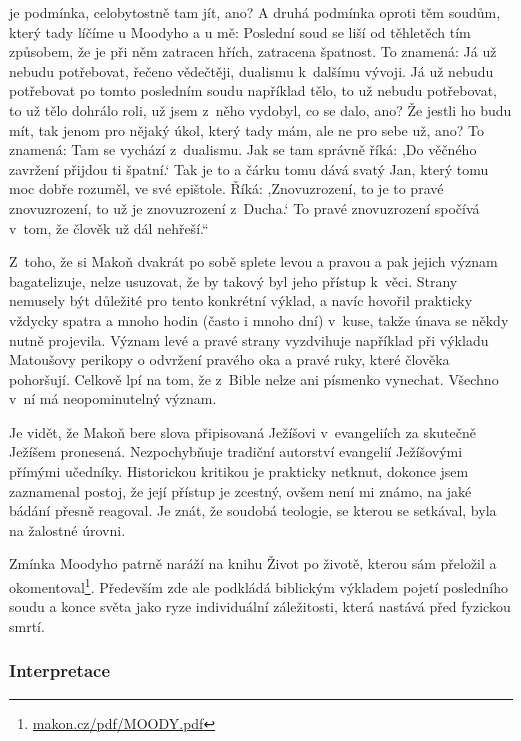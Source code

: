 \begin{enumerate}
{{je podmínka, celobytostně tam jít, ano? A druhá podmínka oproti těm soudům,
který tady líčíme u Moodyho a u mě: Poslední soud se liší od těhletěch tím
způsobem, že je při něm zatracen hřích, zatracena špatnost. To znamená: Já už
nebudu potřebovat, řečeno vědečtěji, dualismu k~dalšímu vývoji. Já už nebudu
potřebovat po tomto posledním soudu například tělo, to už nebudu potřebovat, to
už tělo dohrálo roli, už jsem z~něho vydobyl, co se dalo, ano? Že jestli ho budu
mít, tak jenom pro nějaký úkol, který tady mám, ale ne pro sebe už, ano? To
znamená: Tam se vychází z~dualismu. Jak se tam správně říká: ,Do věčného
zavržení přijdou ti špatní.` Tak je to a čárku tomu dává svatý Jan, který tomu
moc dobře rozuměl, ve své epištole. Říká: ,Znovuzrození, to je to pravé
znovuzrození, to už je znovuzrození z~Ducha.` To pravé znovuzrození spočívá
v~tom, že člověk už dál nehřeší.``
}

Z~toho, že si Makoň dvakrát po sobě splete levou a pravou a pak jejich význam
bagatelizuje, nelze usuzovat, že by takový byl jeho přístup k~věci. Strany
nemusely být důležité pro tento konkrétní výklad, a navíc hovořil prakticky
vždycky spatra a mnoho hodin (často i mnoho dní) v~kuse, takže únava se někdy
nutně projevila. Význam levé a pravé strany vyzdvihuje například při výkladu
Matoušovy perikopy o odvržení pravého oka a pravé ruky, které člověka pohoršují.
Celkově lpí na tom, že z~Bible nelze ani písmenko vynechat. Všechno v~ní má
neopominutelný význam.

Je vidět, že Makoň bere slova připisovaná Ježíšovi v~evangeliích za skutečně
Ježíšem pronesená. Nezpochybňuje tradiční autorství evangelií Ježíšovými přímými
učedníky. Historickou kritikou je prakticky netknut, dokonce jsem zaznamenal
postoj, že její přístup je zcestný, ovšem není mi známo, na jaké bádání přesně
reagoval. Je znát, že soudobá teologie, se kterou se setkával, byla na žalostné
úrovni.

Zmínka Moodyho patrně naráží na knihu Život po životě\cite{moody1975life},
kterou sám přeložil a okomentoval\footnote{\url{makon.cz/pdf/MOODY.pdf}}.
Především zde ale podkládá biblickým výkladem pojetí posledního soudu a konce
světa jako ryze individuální záležitosti, která nastává před fyzickou smrtí.

}

\end{enumerate}

\subsubsection*{Interpretace}

